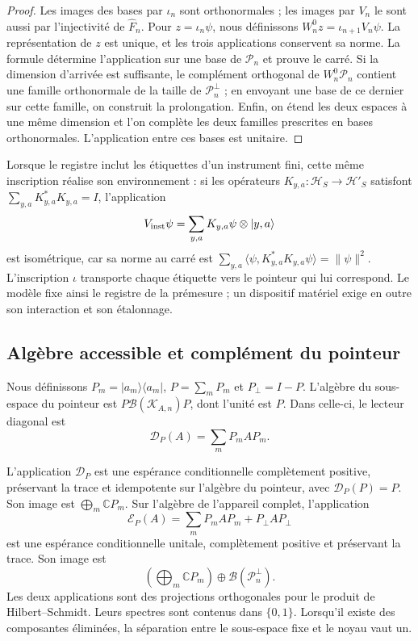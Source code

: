 \begin{proof}
Les images des bases par \(\iota_n\) sont orthonormales ; les
images par \(V_n\) le sont aussi par l'injectivité de
\(\widehat F_n\). Pour \(z=\iota_n\psi\), nous définissons
\(W_n^0z=\iota_{n+1}V_n\psi\). La représentation de \(z\) est unique,
et les trois applications conservent sa norme. La formule détermine l'application sur
une base de \(\mathcal P_n\) et prouve le carré.
Si la dimension d'arrivée est suffisante, le complément orthogonal de
\(W_n^0\mathcal P_n\) contient une famille orthonormale de la taille de
\(\mathcal P_n^\perp\) ; en envoyant une base de ce dernier sur cette famille,
on construit la prolongation. Enfin, on étend les deux espaces à
une même dimension et l'on complète les deux familles prescrites en bases
orthonormales. L'application entre ces bases est unitaire.
\end{proof}

Lorsque le registre inclut les étiquettes d'un instrument fini, cette même inscription réalise son environnement : si les opérateurs \(K_{y,a}:\mathcal H_S\to\mathcal H'_S\) satisfont \(\sum_{y,a}K_{y,a}^*K_{y,a}=I\), l'application
\[
 V_{\rm inst}\psi=\sum_{y,a}K_{y,a}\psi\otimes|y,a\rangle
\]
est isométrique, car sa norme au carré est
\(\sum_{y,a}\langle\psi,K_{y,a}^*K_{y,a}\psi\rangle=\|\psi\|^2\).
L'inscription \(\iota\) transporte chaque étiquette vers le pointeur qui lui
correspond. Le modèle fixe ainsi le registre de la prémesure ; un
dispositif matériel exige en outre son interaction et son étalonnage.

\subsection{Algèbre accessible et complément du pointeur}
\label{vii:vii:sec:observador-expectativa}

Nous définissons \(P_m=|a_m\rangle\langle a_m|\), \(P=\sum_mP_m\) et \(P_\perp=I-P\). L'algèbre du sous-espace du pointeur est \(P\mathcal B(\mathcal K_{A,n})P\), dont l'unité est \(P\). Dans celle-ci, le lecteur diagonal est
\[
 \mathcal D_P(A)=\sum_mP_mAP_m.
\]

\begin{proposition}
\label{vii:vii:prop:observador-pinzamiento}
L'application \(\mathcal D_P\) est une espérance conditionnelle complètement positive, préservant la trace et idempotente sur l'algèbre du pointeur, avec \(\mathcal D_P(P)=P\). Son image est \(\bigoplus_m\mathbb CP_m\). Sur l'algèbre de l'appareil complet, l'application
\begin{equation}
 \mathcal E_P(A)=\sum_mP_mAP_m+P_\perp AP_\perp
 \label{vii:vii:eq:observador-complemento}
\end{equation}
est une espérance conditionnelle unitale, complètement positive et
préservant la trace. Son image est
\[
 \left(\bigoplus_m\mathbb CP_m\right)
 \oplus\mathcal B(\mathcal P_n^\perp).
\]
Les deux applications sont des projections orthogonales pour le produit de
Hilbert--Schmidt. Leurs spectres sont contenus dans \(\{0,1\}\).
Lorsqu'il existe des composantes éliminées, la séparation entre le
sous-espace fixe et le noyau vaut un.
\end{proposition}

